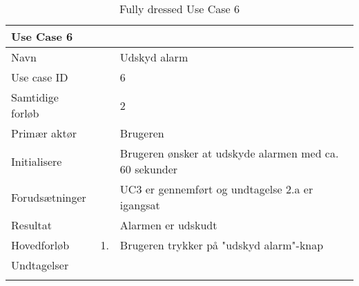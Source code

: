 \begin{longtabu} to  %
    {\large \textbf{Use Case 6}} && \\
    \toprule
    Navn &&    Udskyd alarm\\
    Use case ID &&    6\\
    Samtidige forløb &&    2\\
    Primær aktør &&   Brugeren \\
    Initialisere &&    Brugeren ønsker at udskyde alarmen med ca. 60 sekunder \\
    Forudsætninger && UC3 er gennemført og undtagelse 2.a er igangsat\\
    Resultat &&    Alarmen er udskudt                  \\ \midrule
    Hovedforløb &    1. &    Brugeren trykker på "udskyd alarm"\--knap  \\ \midrule 		
    Undtagelser &     \\ \bottomrule
\caption{Fully dressed Use Case 6}
\label{UC6}
\end{longtabu}


